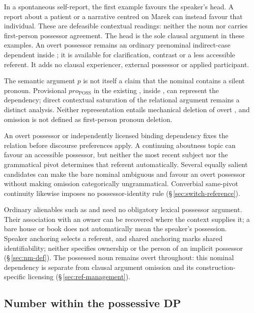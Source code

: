 In a spontaneous self-report, the first example favours the speaker's head.
A report about a patient or a narrative centred on Marek can instead favour
that individual. These are defeasible contextual readings: neither the noun
nor  carries first-person possessor agreement. The head is the
sole clausal argument in these examples. An overt possessor remains an
ordinary prenominal indirect-case dependent inside ; it is
available for clarification, contrast or a less accessible referent. It adds
no clausal experiencer, external possessor or applied participant.

The semantic argument \(p\) is not itself a claim that the nominal
contains a silent pronoun. Provisional \(pro_{\mathrm{POSS}}\) in the
existing , inside , can represent the dependency;
direct contextual saturation of the relational argument remains a distinct
analysis. Neither representation entails mechanical deletion of overt
, and omission is not defined as first-person pronoun deletion.

An overt possessor or independently licensed binding dependency fixes the
relation before discourse preferences apply. A continuing aboutness topic
can favour an accessible possessor, but neither the most recent subject nor
the grammatical pivot determines that referent automatically. Several equally
salient candidates can make the bare nominal ambiguous and favour an overt
possessor without making omission categorically ungrammatical.
Converbial same-pivot continuity likewise imposes no possessor-identity rule
(§\,\ref{sec:switch-reference}).

Ordinary alienables such as   and 
 need no obligatory lexical possessor argument. Their association
with an owner can be recovered where the context supplies it; a bare house
or book does not automatically mean the speaker's possession. Speaker
anchoring  selects a referent, and shared anchoring marks shared
identifiability; neither specifies ownership or the person of an implicit
possessor (§\,\ref{sec:nm-def}). The possessed noun remains overt throughout:
this nominal dependency is separate from clausal argument omission and its
construction-specific licensing (§\,\ref{sec:ref-management}).

\subsection{Number within the possessive DP}
\label{sec:nm-poss-ne}
\label{sec:nm-poss-number}

